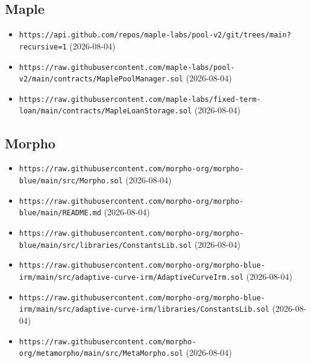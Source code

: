 \subsection*{Maple}
\begin{itemize}\setlength{\itemsep}{0pt}\small
\item \texttt{https://api.github.com/repos/maple-labs/pool-v2/git/trees/main?recursive=1} (2026-08-04)
\item \texttt{https://raw.githubusercontent.com/maple-labs/pool-v2/main/contracts/MaplePoolManager.sol} (2026-08-04)
\item \texttt{https://raw.githubusercontent.com/maple-labs/fixed-term-loan/main/contracts/MapleLoanStorage.sol} (2026-08-04)
\end{itemize}

\subsection*{Morpho}
\begin{itemize}\setlength{\itemsep}{0pt}\small
\item \texttt{https://raw.githubusercontent.com/morpho-org/morpho-blue/main/src/Morpho.sol} (2026-08-04)
\item \texttt{https://raw.githubusercontent.com/morpho-org/morpho-blue/main/README.md} (2026-08-04)
\item \texttt{https://raw.githubusercontent.com/morpho-org/morpho-blue/main/src/libraries/ConstantsLib.sol} (2026-08-04)
\item \texttt{https://raw.githubusercontent.com/morpho-org/morpho-blue-irm/main/src/adaptive-curve-irm/AdaptiveCurveIrm.sol} (2026-08-04)
\item \texttt{https://raw.githubusercontent.com/morpho-org/morpho-blue-irm/main/src/adaptive-curve-irm/libraries/ConstantsLib.sol} (2026-08-04)
\item \texttt{https://raw.githubusercontent.com/morpho-org/metamorpho/main/src/MetaMorpho.sol} (2026-08-04)
\end{itemize}

